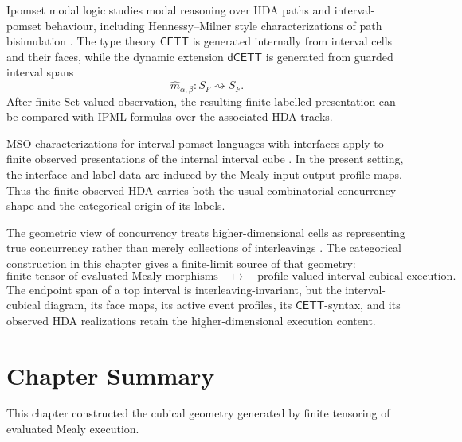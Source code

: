 Ipomset modal logic studies modal reasoning over HDA paths and
interval-pomset behaviour, including Hennessy--Milner style characterizations
of path bisimulation
\cite{ZouariZiemianskiFahrenberg2024}. The type theory \(\mathsf{CETT}\) is
generated internally from interval cells and their faces, while the dynamic
extension \(\mathsf{dCETT}\) is generated from guarded interval spans
\[
    \widehat m_{\alpha,\beta}:S_F\rightsquigarrow S_F.
\]
After finite Set-valued observation, the resulting finite labelled
presentation can be compared with IPML formulas over the associated HDA
tracks.

MSO characterizations for interval-pomset languages with interfaces apply to
finite observed presentations of the internal interval cube
\cite{AmraneBazilleFahrenbergFortin2024}. In the present setting, the
interface and label data are induced by the Mealy input-output profile maps.
Thus the finite observed HDA carries both the usual combinatorial concurrency
shape and the categorical origin of its labels.

The geometric view of concurrency treats higher-dimensional cells as
representing true concurrency rather than merely collections of interleavings
\cite{Pratt1991,Pratt2000,vanGlabbeek2006,FajstrupGoubaultRaussen2006,FajstrupGoubaultHaucourtMimramRaussen2016}.
The categorical construction in this chapter gives a finite-limit source of
that geometry:
\[
    \text{finite tensor of evaluated Mealy morphisms}
    \quad\longmapsto\quad
    \text{profile-valued interval-cubical execution}.
\]
The endpoint span of a top interval is interleaving-invariant, but the
interval-cubical diagram, its face maps, its active event profiles, its
\(\mathsf{CETT}\)-syntax, and its observed HDA realizations retain the
higher-dimensional execution content.

\section{Chapter Summary}
\label{sec:cmett-chapter-summary}

This chapter constructed the cubical geometry generated by finite tensoring of
evaluated Mealy execution.

